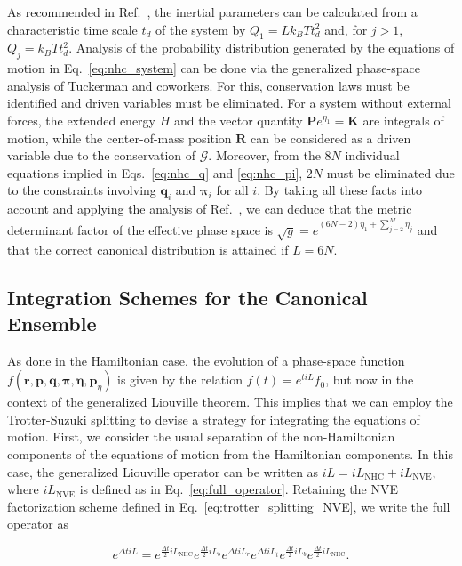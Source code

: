 \documentclass[aip,jcp,reprint,amsmath,amssymb,raggedbottom]{revtex4-1}
\newcommand{\vt}[1]{\boldsymbol{\mathbf{#1}}}           %
\begin{document}
As recommended in Ref.~, the inertial parameters can be calculated from a characteristic time scale $t_d$ of the system by $Q_1 = L k_B T t_d^2$ and, for $j > 1$, $Q_j = k_B T t_d^2$. Analysis of the probability distribution generated by the equations of motion in Eq.~\ref{eq:nhc_system} can be done via the generalized phase-space analysis of Tuckerman and coworkers.\cite{Tuckerman2001} For this, conservation laws must be identified and driven variables must be eliminated. For a system without external forces, the extended energy $H$ and the vector quantity $\vt P e^{\eta_1} = \vt K$ are integrals of motion, while the center-of-mass position $\vt R$ can be considered as a driven variable due to the conservation of $\boldsymbol{\mathcal G}$.\cite{Tuckerman2001} Moreover, from the $8N$ individual equations implied in Eqs.~\ref{eq:nhc_q} and \ref{eq:nhc_pi}, $2N$ must be eliminated due to the constraints involving $\vt q_i$ and $\vt \pi_i$ for all $i$. By taking all these facts into account and applying the analysis of Ref.~, we can deduce that the metric determinant factor of the effective phase space is $\sqrt{g} = e^{(6N-2) \eta_1 + \sum_{j=2}^M \eta_j}$ and that the correct canonical distribution is attained if $L = 6N$.

\subsection{Integration Schemes for the Canonical Ensemble}

As done in the Hamiltonian case, the evolution of a phase-space function $f(\vt r, \vt p, \vt q, \vt \pi, \vt \eta,{\vt p}_\eta)$ is given by the relation $f(t) = e^{t i\!L}f_0$, but now in the context of the generalized Liouville theorem.\cite{Tuckerman_1999} This implies that we can employ the Trotter-Suzuki splitting to devise a strategy for integrating the equations of motion. First, we consider the usual separation of the non-Hamiltonian components of the equations of motion from the Hamiltonian components. In this case, the generalized Liouville operator can be written as $i\!L = i\!L_\text{NHC} + i\!L_\text{NVE}$, where $i\!L_\text{NVE}$ is defined as in Eq.~\ref{eq:full_operator}. Retaining the NVE factorization scheme defined in Eq.~\ref{eq:trotter_splitting_NVE}, we write the full operator as

\begin{equation}
\label{eq:trotter_splitting_NHC}
e^{\Delta t i\!L} = e^{\frac{\Delta t}{2} i\!L_\text{NHC}} e^{\frac{\Delta t}{2} i\!L_b} e^{\Delta t i\!L_r} e^{\Delta t i\!L_t}  e^{\frac{\Delta t}{2} i\!L_b} e^{\frac{\Delta t}{2} i\!L_\text{NHC}}.
\end{equation}
\end{document}
